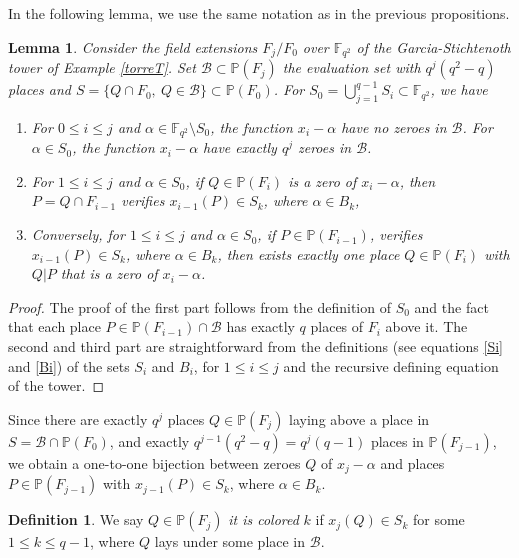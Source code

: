 \documentclass{amsart}
\newcommand{\m}{\mathcal}
\newcommand{\F}{\mathbb{F}}
\renewcommand{\P}{\mathbb{P}}
\newtheorem{lem}[thm]{Lemma}
\theoremstyle{definition}
\newtheorem{defin}{Definition}
\begin{document}
In the following lemma, we use the same notation as in the previous propositions.

\begin{lem}
	Consider the field extensions $F_j/F_0$ over $\F_{q^2}$ of the Garcia-Stichtenoth tower of Example \ref{torreT}. Set $\m{B} \subset \P(F_j)$ the evaluation set with $q^j(q^2-q)$ places and $S = \{Q \cap F_0, \: Q \in \m{B}\} \subset \P(F_0)$. For $S_0 = \bigcup_{j=1}^{q-1} S_i \subset \F_{q^2}$, we have 
	\begin{enumerate}
		\item For $0 \leq i \leq j$ and $\alpha \in \F_{q^2} \setminus S_0$, the function $x_i - \alpha$ have no zeroes in $\m{B}$. For $\alpha \in S_0$, the function $x_i - \alpha$ have exactly $q^j$ zeroes in $\m{B}$.
		\item For $1 \leq i \leq j$ and $\alpha \in S_0$, if $Q \in \P(F_i)$ is a zero of $x_i-\alpha$, then $P=Q \cap F_{i-1}$ verifies $x_{i-1}(P) \in S_k$, where $\alpha \in B_k$,
		\item Conversely, for $1 \leq i \leq j$ and $\alpha \in S_0$, if $P \in \P(F_{i-1})$, verifies $x_{i-1}(P) \in S_k$, where $\alpha \in B_k$, then exists exactly one place $Q \in \P(F_i)$ with $Q|P$ that is a zero of $x_i-\alpha$.
	\end{enumerate}
\end{lem}

\begin{proof}
The proof of the first part follows from the definition of $S_0$ and the fact that each place $P \in \P(F_{i-1})\cap \m{B}$ has exactly $q$ places of $F_i$ above it. The second and third part are straightforward from the definitions (see equations \eqref{Si} and \eqref{Bi}) of the sets $S_i$ and $B_i$, for $1 \leq i \leq j$ and the recursive defining equation of the tower.
\end{proof}

Since there are exactly $q^j$ places $Q \in \P(F_j)$ laying above a place in $S=\m{B}\cap\P(F_0)$, and exactly $q^{j-1}(q^2-q)=q^j(q-1)$ places in $\P(F_{j-1})$, we obtain a one-to-one bijection between zeroes $Q$ of $x_j - \alpha$ and places $P \in \P(F_{j-1})$ with $x_{j-1}(P) \in S_k$, where $\alpha \in B_k$. 

\begin{defin}
	We say $Q \in \P(F_j)$ \textit{it is colored} $k$ if $x_j(Q) \in S_k$ for some $1 \leq k \leq q-1$, where $Q$ lays under some place in $\m{B}$.
\end{defin}
\end{document}
